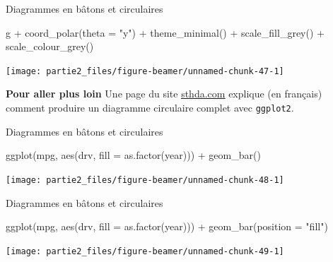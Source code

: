 \documentclass[12pt,ignorenonframetext,]{beamer}
\newenvironment{Shaded}{}{}
\newcommand{\KeywordTok}[1]{\textcolor[rgb]{0.00,0.00,1.00}{#1}}
\newcommand{\DataTypeTok}[1]{#1}
\newcommand{\StringTok}[1]{\textcolor[rgb]{0.00,0.50,0.50}{#1}}
\newcommand{\OperatorTok}[1]{#1}
\newcommand{\NormalTok}[1]{#1}
\renewenvironment{Shaded}{\begin{snugshade}}{\end{snugshade}}
\newcommand{\intertitre}[1]{\textcolor{redInsee}{\textbf{#1}}}
\begin{document}
\begin{frame}[fragile]{Diagrammes en bâtons et circulaires}

\footnotesize \center

\begin{Shaded}
\begin{Highlighting}[]
\NormalTok{g }\OperatorTok{+}\StringTok{ }\KeywordTok{coord_polar}\NormalTok{(}\DataTypeTok{theta =} \StringTok{"y"}\NormalTok{) }\OperatorTok{+}\StringTok{ }\KeywordTok{theme_minimal}\NormalTok{() }\OperatorTok{+}
\StringTok{  }\KeywordTok{scale_fill_grey}\NormalTok{() }\OperatorTok{+}\StringTok{ }\KeywordTok{scale_colour_grey}\NormalTok{()}
\end{Highlighting}
\end{Shaded}

\texttt{[image: partie2\_files/figure-beamer/unnamed-chunk-47-1]}

\pause \raggedright \small

\intertitre{Pour aller plus loin} Une page du site
\href{http://www.sthda.com/french/wiki/ggplot2-graphique-en-camembert-guide-de-demarrage-rapide-logiciel-r-et-visualisation-de-donnees}{\underline{sthda.com}}
explique (en français) comment produire un diagramme circulaire complet
avec \texttt{ggplot2}.

\end{frame}

\begin{frame}[fragile]{Diagrammes en bâtons et circulaires}

\footnotesize \center

\begin{Shaded}
\begin{Highlighting}[]
\KeywordTok{ggplot}\NormalTok{(mpg, }\KeywordTok{aes}\NormalTok{(drv, }\DataTypeTok{fill =} \KeywordTok{as.factor}\NormalTok{(year))) }\OperatorTok{+}\StringTok{ }
\StringTok{  }\KeywordTok{geom_bar}\NormalTok{()}
\end{Highlighting}
\end{Shaded}

\texttt{[image: partie2\_files/figure-beamer/unnamed-chunk-48-1]}

\end{frame}

\begin{frame}[fragile]{Diagrammes en bâtons et circulaires}

\footnotesize \center

\begin{Shaded}
\begin{Highlighting}[]
\KeywordTok{ggplot}\NormalTok{(mpg, }\KeywordTok{aes}\NormalTok{(drv, }\DataTypeTok{fill =} \KeywordTok{as.factor}\NormalTok{(year))) }\OperatorTok{+}\StringTok{ }
\StringTok{  }\KeywordTok{geom_bar}\NormalTok{(}\DataTypeTok{position =} \StringTok{"fill"}\NormalTok{)}
\end{Highlighting}
\end{Shaded}

\texttt{[image: partie2\_files/figure-beamer/unnamed-chunk-49-1]}

\end{frame}
\end{document}
